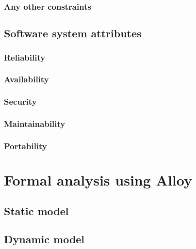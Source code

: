 \documentclass[11pt,twoside]{article}
\begin{document}
		\subsubsection{Any other constraints}
	\subsection{Software system attributes}
		\subsubsection{Reliability}
		\subsubsection{Availability}
		\subsubsection{Security}
		\subsubsection{Maintainability}
		\subsubsection{Portability}
		
\section{Formal analysis using Alloy}
	\subsection{Static model}
	\subsection{Dynamic model}
\end{document}
